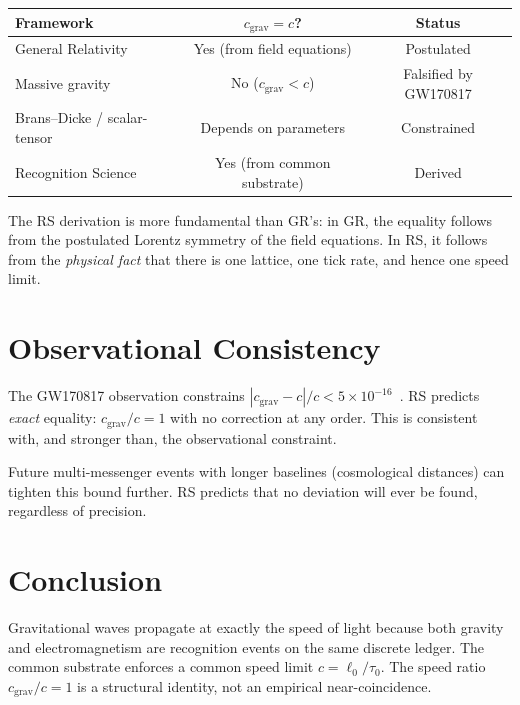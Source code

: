 \documentclass[12pt,a4paper]{article}
\theoremstyle{definition}
\theoremstyle{remark}
\begin{document}
\begin{center}
\renewcommand{\arraystretch}{1.3}
\begin{tabular}{@{}lcc@{}}
\toprule
\textbf{Framework} & $c_{\mathrm{grav}} = c$? &
\textbf{Status} \\
\midrule
General Relativity & Yes (from field equations) & Postulated \\
Massive gravity & No ($c_{\mathrm{grav}} < c$) & Falsified
by GW170817 \\
Brans--Dicke / scalar-tensor & Depends on parameters & Constrained \\
Recognition Science & Yes (from common substrate) & Derived \\
\bottomrule
\end{tabular}
\end{center}

The RS derivation is more fundamental than GR's: in GR, the equality
follows from the postulated Lorentz symmetry of the field equations.
In RS, it follows from the \emph{physical fact} that there is one
lattice, one tick rate, and hence one speed limit.

\section{Observational Consistency}
\label{sec:obs}

The GW170817 observation constrains
$|c_{\mathrm{grav}} - c|/c < 5 \times 10^{-16}$~\cite{GW170817}.
RS predicts \emph{exact} equality: $c_{\mathrm{grav}}/c = 1$ with no
correction at any order.  This is consistent with, and stronger than,
the observational constraint.

Future multi-messenger events with longer baselines (cosmological
distances) can tighten this bound further.  RS predicts that no
deviation will ever be found, regardless of precision.

\section{Conclusion}
\label{sec:conclusion}

Gravitational waves propagate at exactly the speed of light because
both gravity and electromagnetism are recognition events on the same
discrete ledger.  The common substrate enforces a common speed limit
$c = \ell_0/\tau_0$.  The speed ratio $c_{\mathrm{grav}}/c = 1$ is
a structural identity, not an empirical near-coincidence.
\end{document}
